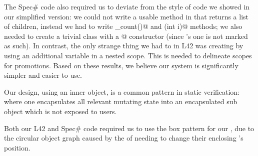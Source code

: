 





\noindent The Spec\# code also required us to deviate from the style of code we showed in our simplified version: we could not write a usable \Q@children@ method in \Q@Widget@ that returns a list of children, instead we had to write \Q@children_count()@ and \Q@children(int i)@ methods; we also needed to create a trivial class with a \Q@[Pure]@ constructor (since \Q@Object@'s one is not marked as such). In contrast, the only strange thing we had to in L42 was creating \Q@Box@es by using 
an additional variable in a nested scope.
This is needed to delineate scopes for promotions.
Based on these results, we believe our system is significantly simpler and easier to use.

Our design, using an inner \Q@Box@ object, is a common pattern in static verification: where one encapsulates all relevant mutating state into an encapsulated sub object which is not exposed to users.

Both our L42 and Spec\# code required us to use the box pattern for our \Q@SafeMovable@, due to the circular object graph caused by the \Q@Action@s of \Q@Button@s needing to change their enclosing \Q@SafeMovable@'s position.

